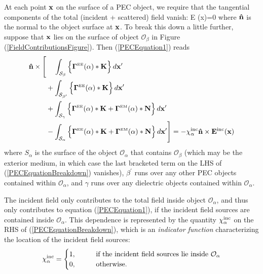 \documentclass[letterpaper]{article}
\begin{document}
At each point $\mathbf{x}$ on the surface of a PEC object,
we require that the tangential components of the 
total (incident + scattered) field vanish:
{ \times \vb E (\vb x)=0 
}
where $\mathbf{\hat n}$ is the normal to the object surface
at $\mathbf{x}$. 
To break this down a little further, suppose that $\mathbf{x}$
lies on the surface of object $\mathcal{O}_\beta$ in
Figure (\ref{FieldContributionsFigure}). Then (\ref{PECEquation1}) 
reads
\begin{align}
\mathbf{\hat n}\times
 \Bigg[  &\hphantom{+}\,\,\int_{\mathcal{S_\beta}} 
           \Big\{ \boldsymbol{\Gamma}^{\hbox{\tiny{EE}}}(\alpha)*\mathbf{K} \Big\} \, d\mathbf{x}^\prime
\nonumber \\
         &+\int_{\mathcal{S_{\beta^\prime}}} 
           \Big\{ \boldsymbol{\Gamma}^{\hbox{\tiny{EE}}}(\alpha)*\mathbf{K} \Big\} \, d\mathbf{x}^\prime
\nonumber \\
         &+\int_{\mathcal{S_\gamma}} 
           \Big\{ \boldsymbol{\Gamma}^{\hbox{\tiny{EE}}}(\alpha)*\mathbf{K} 
                 +\boldsymbol{\Gamma}^{\hbox{\tiny{EM}}}(\alpha)*\mathbf{N} \Big\} \, d\mathbf{x}^\prime
\nonumber \\
         &-\int_{\mathcal{S_\alpha}} 
           \Big\{ \boldsymbol{\Gamma}^{\hbox{\tiny{EE}}}(\alpha)*\mathbf{K} 
                 +\boldsymbol{\Gamma}^{\hbox{\tiny{EM}}}(\alpha)*\mathbf{N} \Big\} \, d\mathbf{x}^\prime
 \Bigg]
= -\chi^{\hbox{\scriptsize{inc}}}_\alpha \mathbf{\hat n}\times \mathbf{E}^{\hbox{\scriptsize{inc}}}(\mathbf{x})
\label{PECEquationBreakdown}
\end{align}
where $S_\alpha$ is the surface of the object $\mathcal{O}_\alpha$ 
that contains $\mathcal{O}_\beta$ (which may be the exterior medium, 
in which case the last bracketed term on the LHS 
of (\ref{PECEquationBreakdown}) vanishes),
$\beta^\prime$ runs over any other PEC objects contained
within $\mathcal{O}_\alpha$, and $\gamma$ runs over
any dielectric objects contained within 
$\mathcal{O}_\alpha$.

The incident field only contributes to the total field
inside object $\mathcal{O}_\alpha$, 
and thus only contributes to equation (\ref{PECEquation1}),
if the incident field sources are contained inside 
$\mathcal{O}_\alpha$. This dependence is represented by the 
quantity $\chi^{\hbox{\scriptsize{inc}}}_\alpha$ on the RHS of 
(\ref{PECEquationBreakdown}), which is an 
\textit{indicator function} characterizing the location of 
the incident field sources:
$$
 \chi^{\hbox{\scriptsize{inc}}}_\alpha
 =\begin{cases} 
    1, \qquad &\text{if the incident field sources lie inside 
                      $\mathcal{O}_\alpha$} \\
    0, \qquad &\text{otherwise.}
  \end{cases} 
$$
\end{document}
